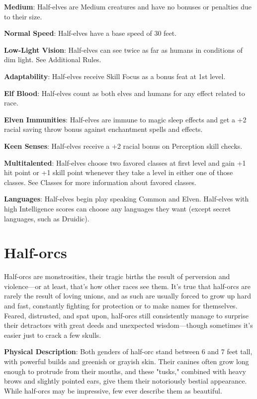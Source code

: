 \textbf{Medium}: Half-elves are Medium creatures and have no bonuses or penalties due to their size.
				
\textbf{Normal Speed}: Half-elves have a base speed of 30 feet.
				
\textbf{Low-Light Vision}: Half-elves can see twice as far as humans in conditions of dim light. See Additional Rules.
				
\textbf{Adaptability}: Half-elves receive Skill Focus as a bonus feat at 1st level.
				
\textbf{Elf Blood}: Half-elves count as both elves and humans for any effect related to race.
				
\textbf{Elven Immunities}: Half-elves are immune to magic sleep effects and get a +2 racial saving throw bonus against enchantment spells and effects.
				
\textbf{Keen Senses}: Half-elves receive a +2 racial bonus on Perception skill checks.
				
\textbf{Multitalented}: Half-elves choose two favored classes at first level and gain +1 hit point or +1 skill point whenever they take a level in either one of those classes. See Classes for more information about favored classes. 
				
\textbf{Languages}: Half-elves begin play speaking Common and Elven. Half-elves with high Intelligence scores can choose any languages they want (except secret languages, such as Druidic).
							
\section{Half-orcs}

				
Half-orcs are monstrosities, their tragic births the result of perversion and violence---or at least, that's how other races see them. It's true that half-orcs are rarely the result of loving unions, and as such are usually forced to grow up hard and fast, constantly fighting for protection or to make names for themselves. Feared, distrusted, and spat upon, half-orcs still consistently manage to surprise their detractors with great deeds and unexpected wisdom---though sometimes it's easier just to crack a few skulls.
				
\textbf{Physical Description}: Both genders of half-orc stand between 6 and 7 feet tall, with powerful builds and greenish or grayish skin. Their canines often grow long enough to protrude from their mouths, and these "tusks," combined with heavy brows and slightly pointed ears, give them their notoriously bestial appearance. While half-orcs may be impressive, few ever describe them as beautiful.
				
